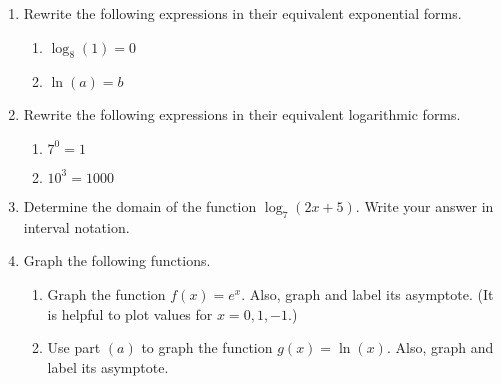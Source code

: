 




\begin{enumerate}
\item  Rewrite the following expressions in their equivalent exponential forms.
\begin{enumerate}
\item $\log_8(1)=0$
\vfill
\item $\ln(a)=b$
\vfill
\end{enumerate}


\item Rewrite the following expressions in their equivalent
  logarithmic forms.
\begin{enumerate}
\item $7^0=1$
\vfill
\item $10^3=1000$
\vfill
\end{enumerate}

\item Determine the domain of the function $\log_7(2x+5)$.  Write your
  answer in interval notation.

  \vfill
  \vfill

\newpage
\item  Graph the following functions.
\begin{enumerate}

\item Graph the function $\displaystyle f(x)=e^x$. Also, graph and
  label its asymptote.  (It is helpful to plot values for
  $x=0, 1, -1$.)
  



\item Use part $(a)$ to graph the function
  $\displaystyle g(x)=\ln(x)$. Also, graph and label its asymptote.


\end{enumerate}
\end{enumerate}
